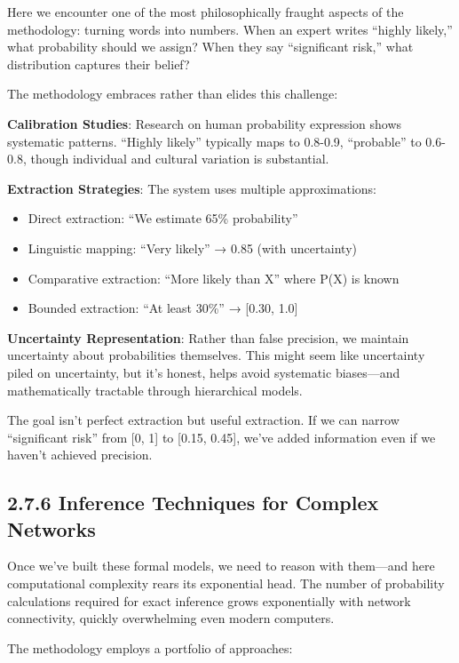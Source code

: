 \documentclass[
  11pt,
  letterpaper,
  openany]{book}
\providecommand{\tightlist}{%
  \setlength{\itemsep}{0pt}\setlength{\parskip}{0pt}}
\begin{document}
Here we encounter one of the most philosophically fraught aspects of the
methodology: turning words into numbers. When an expert writes ``highly
likely,'' what probability should we assign? When they say ``significant
risk,'' what distribution captures their belief?

The methodology embraces rather than elides this challenge:

\textbf{Calibration Studies}: Research on human probability expression
shows systematic patterns. ``Highly likely'' typically maps to 0.8-0.9,
``probable'' to 0.6-0.8, though individual and cultural variation is
substantial.

\textbf{Extraction Strategies}: The system uses multiple approximations:

\begin{itemize}
\tightlist
\item
  Direct extraction: ``We estimate 65\% probability''
\item
  Linguistic mapping: ``Very likely'' → 0.85 (with uncertainty)
\item
  Comparative extraction: ``More likely than X'' where P(X) is known
\item
  Bounded extraction: ``At least 30\%'' → {[}0.30, 1.0{]}
\end{itemize}

\textbf{Uncertainty Representation}: Rather than false precision, we
maintain uncertainty about probabilities themselves. This might seem
like uncertainty piled on uncertainty, but it's honest, helps avoid
systematic biases---and mathematically tractable through hierarchical
models.

The goal isn't perfect extraction but useful extraction. If we can
narrow ``significant risk'' from {[}0, 1{]} to {[}0.15, 0.45{]}, we've
added information even if we haven't achieved precision.

\subsection{2.7.6 Inference Techniques for Complex
Networks}\label{sec-inference-techniques}

Once we've built these formal models, we need to reason with them---and
here computational complexity rears its exponential head. The number of
probability calculations required for exact inference grows
exponentially with network connectivity, quickly overwhelming even
modern computers.

The methodology employs a portfolio of approaches:
\end{document}
